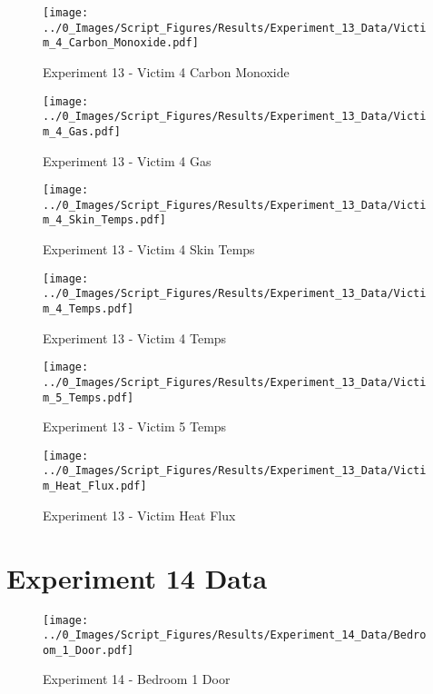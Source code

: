 	\begin{figure}[H]
		\centering
		\texttt{[image: ../0\_Images/Script\_Figures/Results/Experiment\_13\_Data/Victim\_4\_Carbon\_Monoxide.pdf]}
		\caption[]{Experiment 13 - Victim 4 Carbon Monoxide}
	\end{figure}
 
	\clearpage

	\begin{figure}[H]
		\centering
		\texttt{[image: ../0\_Images/Script\_Figures/Results/Experiment\_13\_Data/Victim\_4\_Gas.pdf]}
		\caption[]{Experiment 13 - Victim 4 Gas}
	\end{figure}
 

	\begin{figure}[H]
		\centering
		\texttt{[image: ../0\_Images/Script\_Figures/Results/Experiment\_13\_Data/Victim\_4\_Skin\_Temps.pdf]}
		\caption[]{Experiment 13 - Victim 4 Skin Temps}
	\end{figure}
 
	\clearpage

	\begin{figure}[H]
		\centering
		\texttt{[image: ../0\_Images/Script\_Figures/Results/Experiment\_13\_Data/Victim\_4\_Temps.pdf]}
		\caption[]{Experiment 13 - Victim 4 Temps}
	\end{figure}
 

	\begin{figure}[H]
		\centering
		\texttt{[image: ../0\_Images/Script\_Figures/Results/Experiment\_13\_Data/Victim\_5\_Temps.pdf]}
		\caption[]{Experiment 13 - Victim 5 Temps}
	\end{figure}
 
	\clearpage

	\begin{figure}[H]
		\centering
		\texttt{[image: ../0\_Images/Script\_Figures/Results/Experiment\_13\_Data/Victim\_Heat\_Flux.pdf]}
		\caption[]{Experiment 13 - Victim Heat Flux}
	\end{figure}
 

\clearpage		\large
\section{Experiment 14 Data} \label{App:Exp14Results} 

	\begin{figure}[H]
		\centering
		\texttt{[image: ../0\_Images/Script\_Figures/Results/Experiment\_14\_Data/Bedroom\_1\_Door.pdf]}
		\caption[]{Experiment 14 - Bedroom 1 Door}
	\end{figure}
 

